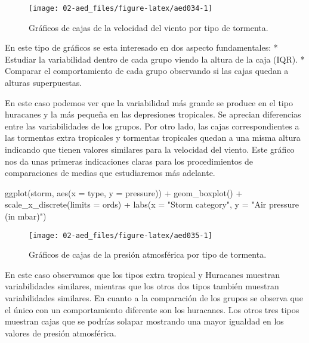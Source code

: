 \documentclass[
]{book}
\newenvironment{Shaded}{\begin{snugshade}}{\end{snugshade}}
\newcommand{\AttributeTok}[1]{\textcolor[rgb]{0.77,0.63,0.00}{#1}}
\newcommand{\FunctionTok}[1]{\textcolor[rgb]{0.00,0.00,0.00}{#1}}
\newcommand{\NormalTok}[1]{#1}
\newcommand{\SpecialCharTok}[1]{\textcolor[rgb]{0.00,0.00,0.00}{#1}}
\newcommand{\StringTok}[1]{\textcolor[rgb]{0.31,0.60,0.02}{#1}}
\begin{document}
\begin{figure}

{\centering \texttt{[image: 02-aed\_files/figure-latex/aed034-1]} 

}

\caption{Gráficos de cajas de la velocidad del viento por tipo de tormenta.}\label{fig:aed034}
\end{figure}

En este tipo de gráficos se esta interesado en dos aspecto fundamentales: * Estudiar la variabilidad dentro de cada grupo viendo la altura de la caja (IQR). * Comparar el comportamiento de cada grupo observando si las cajas quedan a alturas superpuestas.

En este caso podemos ver que la variabilidad más grande se produce en el tipo huracanes y la más pequeña en las depresiones tropicales. Se aprecian diferencias entre las variabilidades de los grupos. Por otro lado, las cajas correspondientes a las tormentas extra tropicales y tormentas tropicales quedan a una misma altura indicando que tienen valores similares para la velocidad del viento. Este gráfico nos da unas primeras indicaciones claras para los procedimientos de comparaciones de medias que estudiaremos más adelante.

\begin{Shaded}
\begin{Highlighting}[]
\FunctionTok{ggplot}\NormalTok{(storm, }\FunctionTok{aes}\NormalTok{(}\AttributeTok{x =}\NormalTok{ type, }\AttributeTok{y =}\NormalTok{ pressure)) }\SpecialCharTok{+} 
  \FunctionTok{geom\_boxplot}\NormalTok{() }\SpecialCharTok{+} 
  \FunctionTok{scale\_x\_discrete}\NormalTok{(}\AttributeTok{limits =}\NormalTok{ ords) }\SpecialCharTok{+}
  \FunctionTok{labs}\NormalTok{(}\AttributeTok{x =} \StringTok{"Storm category"}\NormalTok{, }\AttributeTok{y =} \StringTok{"Air pressure (in mbar)"}\NormalTok{) }
\end{Highlighting}
\end{Shaded}

\begin{figure}

{\centering \texttt{[image: 02-aed\_files/figure-latex/aed035-1]} 

}

\caption{Gráficos de cajas de la presión atmosférica por tipo de tormenta.}\label{fig:aed035}
\end{figure}

En este caso observamos que los tipos extra tropical y Huracanes muestran variabilidades similares, mientras que los otros dos tipos también muestran variabilidades similares. En cuanto a la comparación de los grupos se observa que el único con un comportamiento diferente son los huracanes. Los otros tres tipos muestran cajas que se podrías solapar mostrando una mayor igualdad en los valores de presión atmosférica.
\end{document}
